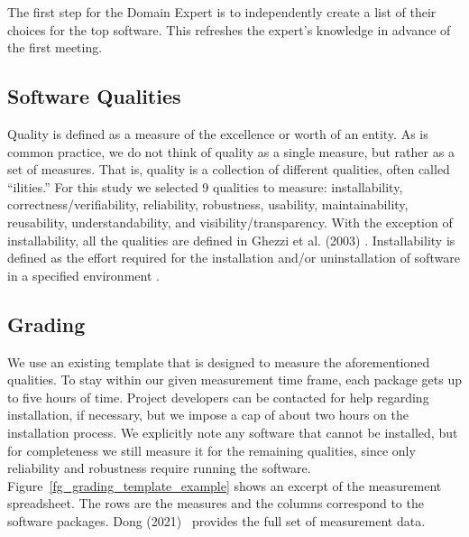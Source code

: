 \documentclass[draft, 12pt, 3p, times]{elsarticle} %
\begin{document}
The first step for the Domain Expert is to independently create a list of their
choices for the top software.  This refreshes the expert's knowledge in advance
of the first meeting.

\subsection{Software Qualities} \label{sec_software_quality}

Quality is defined as a measure of the excellence or worth of an entity.  As is
common practice, we do not think of quality as a single measure, but rather as a
set of measures.  That is, quality is a collection of different qualities, often
called ``ilities.''  For this study we selected 9 qualities to measure:
installability, correctness/verifiability, reliability, robustness, usability,
maintainability, reusability, understandability, and visibility/transparency.
With the exception of installability, all the qualities are defined in Ghezzi et
al. (2003) \cite{GhezziEtAl2003}. Installability is defined as the effort
required for the installation and/or uninstallation of software in a specified
environment \cite{ISO/IEC25010}.

\subsection{Grading} \label{sec_grading_software}

We use an existing template \cite{SmithEtAl2021} that is designed to measure the
aforementioned qualities. To stay within our given measurement time frame, each
package gets up to five hours of time.  Project developers can be contacted for
help regarding installation, if necessary, but we impose a cap of about two
hours on the installation process.  We explicitly note any software that cannot
be installed, but for completeness we still measure it for the remaining
qualities, since only reliability and robustness require running the software.
Figure~\ref{fg_grading_template_example} shows an excerpt of the measurement
spreadsheet.  The rows are the measures and the columns correspond to the
software packages.  Dong (2021)~\cite{Dong2021-Data} provides the full set of
measurement data. 
\end{document}
